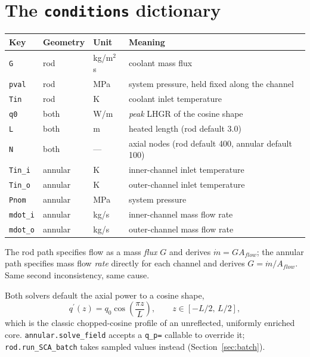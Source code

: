 \documentclass[11pt]{article}
\newcommand{\code}[1]{\texttt{#1}}
\newcommand{\qp}{q^{\prime}}
\begin{document}
\section{The \code{conditions} dictionary}

\begin{center}
\begin{tabular}{lllp{5.6cm}}
\toprule
Key & Geometry & Unit & Meaning \\
\midrule
\code{G}      & rod & kg/m$^2$\,s & coolant mass flux \\
\code{pval}   & rod & MPa & system pressure, held fixed along the channel \\
\code{Tin}    & rod & K & coolant inlet temperature \\
\code{q0}     & both & W/m & \emph{peak} LHGR of the cosine shape \\
\code{L}      & both & m & heated length (rod default 3.0) \\
\code{N}      & both & --- & axial nodes (rod default 400, annular default 100) \\
\midrule
\code{Tin\_i} & annular & K & inner-channel inlet temperature \\
\code{Tin\_o} & annular & K & outer-channel inlet temperature \\
\code{Pnom}   & annular & MPa & system pressure \\
\code{mdot\_i} & annular & kg/s & inner-channel mass flow rate \\
\code{mdot\_o} & annular & kg/s & outer-channel mass flow rate \\
\bottomrule
\end{tabular}
\end{center}

The rod path specifies flow as a mass \emph{flux} $G$ and derives $\dot m = G A_{flow}$;
the annular path specifies mass flow \emph{rate} directly for each channel and derives
$G = \dot m / A_{flow}$. Same second inconsistency, same cause.

Both solvers default the axial power to a cosine shape,
\begin{equation}
\qp(z) = q_0 \cos\!\left(\frac{\pi z}{L}\right), \qquad z \in [-L/2,\, L/2],
\end{equation}
which is the classic chopped-cosine profile of an unreflected, uniformly enriched core.
\code{annular.solve\_field} accepts a \code{q\_p=} callable to override it;
\code{rod.run\_SCA\_batch} takes sampled values instead (Section~\ref{sec:batch}).
\end{document}
